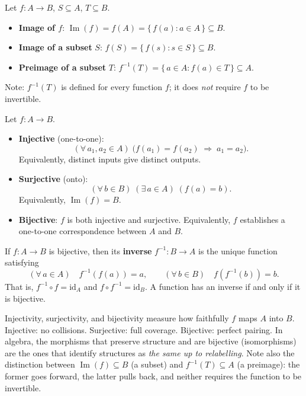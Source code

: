 \begin{definition}
  Let $f : A \to B$, $S \subseteq A$, $T \subseteq B$.
  \begin{itemize}
    \item \textbf{Image of $f$}:
      $\displaystyle\operatorname{Im}(f) = f(A) = \{\,f(a) : a \in A\,\}
       \subseteq B$.
    \item \textbf{Image of a subset} $S$:
      $\displaystyle f(S) = \{\,f(s) : s \in S\,\} \subseteq B$.
    \item \textbf{Preimage of a subset} $T$:
      $\displaystyle f^{-1}(T) = \{\,a \in A : f(a) \in T\,\} \subseteq A$.
  \end{itemize}
  Note: $f^{-1}(T)$ is defined for every function $f$; it does \emph{not}
  require $f$ to be invertible.
\end{definition}

\begin{definition}
  Let $f : A \to B$.
  \begin{itemize}
    \item \textbf{Injective} (one-to-one):
      \[
        (\forall\, a_1, a_2 \in A)\;
        \bigl(f(a_1) = f(a_2) \;\Rightarrow\; a_1 = a_2\bigr).
      \]
      Equivalently, distinct inputs give distinct outputs.
    \item \textbf{Surjective} (onto):
      \[
        (\forall\, b \in B)\;(\exists\, a \in A)\;(f(a) = b).
      \]
      Equivalently, $\operatorname{Im}(f) = B$.
    \item \textbf{Bijective}: $f$ is both injective and surjective.
      Equivalently, $f$ establishes a one-to-one correspondence between
      $A$ and $B$.
  \end{itemize}
\end{definition}

\begin{definition}
  If $f : A \to B$ is bijective, then its \textbf{inverse}
  $f^{-1} : B \to A$ is the unique function satisfying
  \[
    (\forall\, a \in A)\quad f^{-1}(f(a)) = a,
    \qquad
    (\forall\, b \in B)\quad f(f^{-1}(b)) = b.
  \]
  That is, $f^{-1} \circ f = \mathrm{id}_A$ and
  $f \circ f^{-1} = \mathrm{id}_B$.
  A function has an inverse if and only if it is bijective.
\end{definition}

\begin{remark}
  Injectivity, surjectivity, and bijectivity measure how faithfully
  $f$ maps $A$ into $B$.  Injective: no collisions.  Surjective: full
  coverage.  Bijective: perfect pairing.  In algebra, the morphisms that
  preserve structure and are bijective (isomorphisms) are the ones that
  identify structures as \emph{the same up to relabelling}.
  Note also the distinction between $\operatorname{Im}(f) \subseteq B$
  (a subset) and $f^{-1}(T) \subseteq A$ (a preimage): the former goes
  forward, the latter pulls back, and neither requires the function to be
  invertible.
\end{remark}

